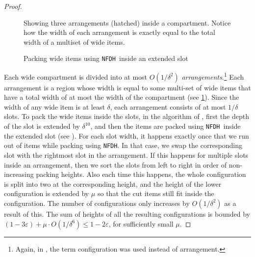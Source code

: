 \documentclass[10pt,a4paper]{amsart}
\newcommand{\kvn}[1]{#1}
\newcommand{\eps}{\varepsilon}
\newcommand{\NFDH}{\texttt{NFDH}\xspace}
\theoremstyle{definition}
\begin{document}
\begin{proof}

\begin{figure}
    \centering
        
    \caption{Showing three arrangements (hatched) inside a compartment. Notice how the width of each arrangement is exactly equal to the total width of a multiset of wide items.}
\label{fig:arrangements}
\end{figure}


\begin{figure}
    \centering
    
    \caption{Packing wide items using \NFDH~inside an extended slot}
\label{fig:nfdhcrossing}
\end{figure}

Each wide compartment is divided into at most $O(1/\delta^2)$ \textit{arrangements}.\footnote{Again, in \cite{3d-strip-packing, jansen-pradel-bin-packing}, the term configuration was used instead of arrangement.} Each arrangement is a region whose width is equal to some multi-set of wide items that have a total width of at most the width of the compartment (see \cref{fig:arrangements}). Since the width of any wide item is at least $\delta$, each arrangement consists of at most $1/\delta$ slots. %
To pack the wide items inside the slots, in the algorithm of \cite{3d-strip-packing}, first the depth of the slot is extended by $\delta^{10}$, and then the items are packed using \NFDH~inside the extended slot (see ). 
For each slot width, it happens exactly once that we run out of items while packing using \NFDH. In that case, we swap the corresponding slot with the rightmost slot in the arrangement. If this happens for multiple slots inside an arrangement, then we sort the slots from left to right in order of non-increasing packing heights. Also each time this happens, the whole configuration is split into two at the corresponding height, and the height of the lower configuration is extended by $\mu$ so that the cut items still fit inside the configuration. The number of configurations only increases by $O(1/\delta^2)$ as a result of this. The sum of heights of all the resulting configurations is bounded by $(1-3\eps)+\mu\cdot O(1/\delta^6) \le 1-2\eps$, for sufficiently small $\mu$.


\end{proof}
\end{document}
